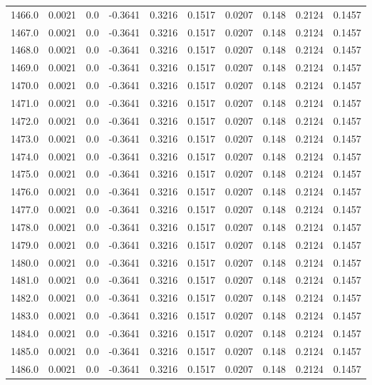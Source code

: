 \begin{longtable}{lrrrrrrrrr}
1466.0 & 0.0021 & 0.0 & -0.3641 & 0.3216 & 0.1517 & 0.0207 & 0.148 & 0.2124 & 0.1457 \\
1467.0 & 0.0021 & 0.0 & -0.3641 & 0.3216 & 0.1517 & 0.0207 & 0.148 & 0.2124 & 0.1457 \\
1468.0 & 0.0021 & 0.0 & -0.3641 & 0.3216 & 0.1517 & 0.0207 & 0.148 & 0.2124 & 0.1457 \\
1469.0 & 0.0021 & 0.0 & -0.3641 & 0.3216 & 0.1517 & 0.0207 & 0.148 & 0.2124 & 0.1457 \\
1470.0 & 0.0021 & 0.0 & -0.3641 & 0.3216 & 0.1517 & 0.0207 & 0.148 & 0.2124 & 0.1457 \\
1471.0 & 0.0021 & 0.0 & -0.3641 & 0.3216 & 0.1517 & 0.0207 & 0.148 & 0.2124 & 0.1457 \\
1472.0 & 0.0021 & 0.0 & -0.3641 & 0.3216 & 0.1517 & 0.0207 & 0.148 & 0.2124 & 0.1457 \\
1473.0 & 0.0021 & 0.0 & -0.3641 & 0.3216 & 0.1517 & 0.0207 & 0.148 & 0.2124 & 0.1457 \\
1474.0 & 0.0021 & 0.0 & -0.3641 & 0.3216 & 0.1517 & 0.0207 & 0.148 & 0.2124 & 0.1457 \\
1475.0 & 0.0021 & 0.0 & -0.3641 & 0.3216 & 0.1517 & 0.0207 & 0.148 & 0.2124 & 0.1457 \\
1476.0 & 0.0021 & 0.0 & -0.3641 & 0.3216 & 0.1517 & 0.0207 & 0.148 & 0.2124 & 0.1457 \\
1477.0 & 0.0021 & 0.0 & -0.3641 & 0.3216 & 0.1517 & 0.0207 & 0.148 & 0.2124 & 0.1457 \\
1478.0 & 0.0021 & 0.0 & -0.3641 & 0.3216 & 0.1517 & 0.0207 & 0.148 & 0.2124 & 0.1457 \\
1479.0 & 0.0021 & 0.0 & -0.3641 & 0.3216 & 0.1517 & 0.0207 & 0.148 & 0.2124 & 0.1457 \\
1480.0 & 0.0021 & 0.0 & -0.3641 & 0.3216 & 0.1517 & 0.0207 & 0.148 & 0.2124 & 0.1457 \\
1481.0 & 0.0021 & 0.0 & -0.3641 & 0.3216 & 0.1517 & 0.0207 & 0.148 & 0.2124 & 0.1457 \\
1482.0 & 0.0021 & 0.0 & -0.3641 & 0.3216 & 0.1517 & 0.0207 & 0.148 & 0.2124 & 0.1457 \\
1483.0 & 0.0021 & 0.0 & -0.3641 & 0.3216 & 0.1517 & 0.0207 & 0.148 & 0.2124 & 0.1457 \\
1484.0 & 0.0021 & 0.0 & -0.3641 & 0.3216 & 0.1517 & 0.0207 & 0.148 & 0.2124 & 0.1457 \\
1485.0 & 0.0021 & 0.0 & -0.3641 & 0.3216 & 0.1517 & 0.0207 & 0.148 & 0.2124 & 0.1457 \\
1486.0 & 0.0021 & 0.0 & -0.3641 & 0.3216 & 0.1517 & 0.0207 & 0.148 & 0.2124 & 0.1457 \\

\end{longtable}
